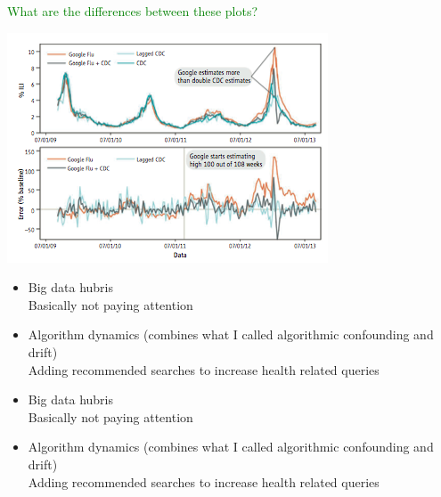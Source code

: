 \documentclass[aspectratio=169]{beamer}
\begin{document}
\begin{frame}

\textcolor{green}{What are the differences between these plots?}

\begin{center}
\includegraphics[width=\textwidth]{figures/lazer_parable_2014_fig1}
\end{center}

\end{frame}
\begin{frame}

\begin{itemize}
\item Big data hubris\\
Basically not paying attention
\pause
\item Algorithm dynamics (combines what I called algorithmic confounding and drift)\\
Adding recommended searches to increase health related queries
\end{itemize}

\end{frame}
\begin{frame}

\begin{itemize}
\item Big data hubris\\
Basically not paying attention
\pause
\item Algorithm dynamics (combines what I called algorithmic confounding and drift)\\
Adding recommended searches to increase health related queries
\end{itemize}

\end{frame}
\end{document}
